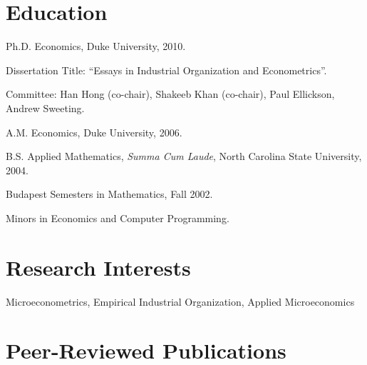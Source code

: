 \documentclass[10pt,letterpaper]{article}
\renewenvironment{itemize}{
  \begin{list}{}{
      \setlength{\leftmargin}{1.5em}
      \setlength{\itemsep}{0.25em}
      \setlength{\parskip}{0pt}
      \setlength{\parsep}{0.25em}
    }
}{
  \end{list}
}
\begin{document}
\section*{Education}

\begin{itemize}
  \item Ph.D. Economics, Duke University, 2010.
    \begin{itemize}
    \item Dissertation Title: ``Essays in Industrial Organization and Econometrics''.
    \item Committee: Han Hong (co-chair), Shakeeb Khan (co-chair), Paul Ellickson, Andrew Sweeting.
    \end{itemize}
  \item A.M. Economics, Duke University, 2006.
  \item B.S. Applied Mathematics, \textit{Summa Cum Laude},
    North Carolina State University, 2004.
    \begin{itemize}
    \item Budapest Semesters in Mathematics, Fall 2002.
    \item Minors in Economics and Computer Programming.
    \end{itemize}
\end{itemize}

\section*{Research Interests}

Microeconometrics, Empirical Industrial Organization, Applied Microeconomics

\section*{Peer-Reviewed Publications}
\end{document}
